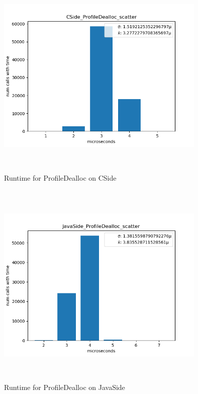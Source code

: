     \begin{figure}[H]
	    \centering
	    \includegraphics[width=10cm,height=10cm,keepaspectratio]{jmh/jni-overhead/CSide_ProfileDealloc_scatter.png}
	    \caption{Runtime for ProfileDealloc on CSide}
	    \label{fig:jolteon-jmh-runtime-profileDealloc-c}
    \end{figure}
    \begin{figure}[H]
	    \centering
	    \includegraphics[width=10cm,height=10cm,keepaspectratio]{jmh/jni-overhead/JavaSide_ProfileDealloc_scatter.png}
	    \caption{Runtime for ProfileDealloc on JavaSide}
	    \label{fig:jolteon-jmh-runtime-profileDealloc-java}
    \end{figure}

